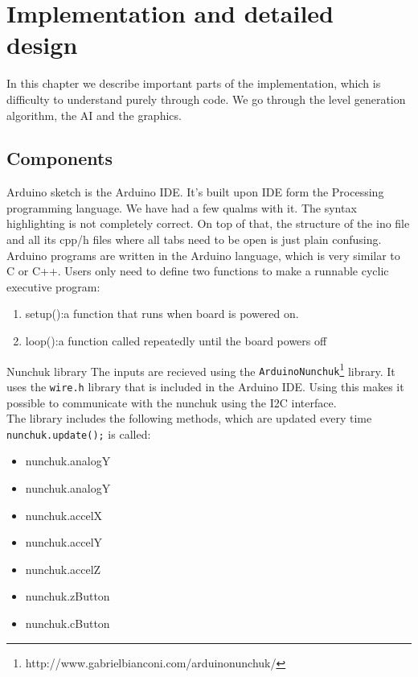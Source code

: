 \chapter{Implementation and detailed design} %
In this chapter we describe important parts of the implementation, which is difficulty to understand purely through code. We go through the level generation algorithm, the AI and the graphics.

\section{Components}
Arduino sketch is the Arduino IDE. It's built upon IDE form the Processing programming language. We have had a few qualms with it. The syntax highlighting is not completely correct. On top of that, the structure of the ino file and all its cpp/h files where all tabs need to be open is just plain confusing.
\newline
Arduino programs are written in the Arduino language, which is very similar to C or C++. Users only need to define two functions to make a runnable cyclic executive program: 
\begin{enumerate}
\item setup():a function that runs when board is powered on.
\item loop():a function called repeatedly until the board powers off
\end{enumerate}
Nunchuk library
The inputs are recieved using the {\tt ArduinoNunchuk}\footnote{http://www.gabrielbianconi.com/arduinonunchuk/} library.
It uses the {\tt wire.h} library that is included in the Arduino IDE.
Using this makes it possible to communicate with the
nunchuk using the I2C interface.\\
The library includes the following methods, which are updated every time {\tt nunchuk.update();} is called:
\begin{multicols}{3}
\begin{itemize}
    \item nunchuk.analogY
    \item nunchuk.analogY
    \item nunchuk.accelX
    \item nunchuk.accelY
    \item nunchuk.accelZ
    \item nunchuk.zButton
    \item nunchuk.cButton
\end{itemize}
\end{multicols}
